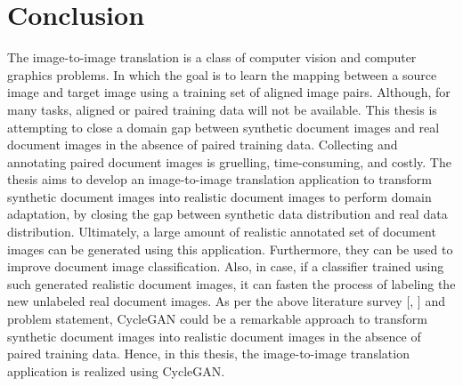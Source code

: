 \section{Conclusion}\label{rwconclusion}

The image-to-image translation is a class of computer vision and computer graphics problems. In which the goal is to learn the mapping between a source image and target image using a training set of aligned image pairs. Although, for many tasks, aligned or paired training data will not be available. This thesis is attempting to close a domain gap between synthetic document images and real document images in the absence of paired training data. Collecting and annotating paired document images is gruelling, time-consuming, and costly. The thesis aims to develop an image-to-image translation application to transform synthetic document images into realistic document images to perform domain adaptation, by closing the gap between synthetic data distribution and real data distribution. Ultimately, a large amount of realistic annotated set of document images can be generated using this application. Furthermore, they can be used to improve document image classification. Also, in case, if a classifier trained using such generated realistic document images, it can fasten the process of labeling the new unlabeled real document images. As per the above literature survey [\cite{zhu2020unpaired}, \cite{sharma2019learning}] and problem statement, \ac{CycleGAN} could be a remarkable approach to transform synthetic document images into realistic document images in the absence of paired training data. Hence, in this thesis, the image-to-image translation application is realized using \ac{CycleGAN}.








